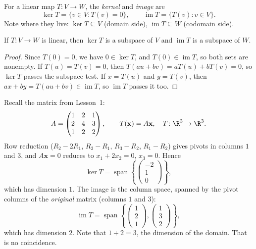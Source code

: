 \begin{definition}
For a linear map $T\colon V\to W$, the \emph{kernel} and \emph{image} are
\[
  \ker T=\{v\in V:T(v)=0\}, \qquad
  \operatorname{im} T=\{T(v):v\in V\}.
\]
Note where they live: $\ker T\subseteq V$ (domain side),
$\operatorname{im}T\subseteq W$ (codomain side).
\end{definition}

\begin{theorem}\label{thm:ker-im-subspace}
If $T\colon V\to W$ is linear, then $\ker T$ is a subspace of $V$ and
$\operatorname{im}T$ is a subspace of $W$.
\end{theorem}

\begin{proof}
Since $T(0)=0$, we have $0\in\ker T$, and $T(0)\in\operatorname{im}T$,
so both sets are nonempty. If $T(u)=T(v)=0$, then
$T(au+bv)=aT(u)+bT(v)=0$, so $\ker T$ passes the subspace test.
If $x=T(u)$ and $y=T(v)$, then $ax+by=T(au+bv)\in\operatorname{im}T$,
so $\operatorname{im}T$ passes it too.
\end{proof}

\begin{example}\label{ex:kernel-image-matrix}
Recall the matrix from Lesson~1:
\[
  A=\begin{pmatrix}1&2&1\\2&4&3\\1&2&2\end{pmatrix},
  \qquad T(\mathbf{x})=A\mathbf{x},\quad T\colon\R^3\to\R^3.
\]
Row reduction ($R_2-2R_1$, $R_3-R_1$, $R_3-R_2$, $R_1-R_2$) gives pivots
in columns $1$ and $3$, and $A\mathbf{x}=0$ reduces to $x_1+2x_2=0$,
$x_3=0$. Hence
\[
  \ker T=\operatorname{span}\left\{\begin{pmatrix}-2\\1\\0\end{pmatrix}\right\},
\]
which has dimension $1$. The image is the column space, spanned by the
pivot columns of the \emph{original} matrix (columns $1$ and $3$):
\[
  \operatorname{im}T
  =\operatorname{span}\left\{
    \begin{pmatrix}1\\2\\1\end{pmatrix},
    \begin{pmatrix}1\\3\\2\end{pmatrix}\right\},
\]
which has dimension $2$. Note that $1+2=3$, the dimension of the domain.
That is no coincidence.
\end{example}


